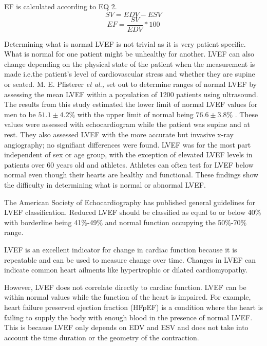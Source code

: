 \documentclass[12pt]{article}
\begin{document}
EF is calculated according to EQ 2.
\begin{equation}
SV = EDV - ESV
\end{equation}
\begin{equation}
EF = \frac{SV}{EDV} * 100   
\end{equation}

Determining what is normal LVEF is not trivial as it is very patient specific.
What is normal for one patient might be unhealthy for another.
LVEF can also change depending on the physical state of the patient when the measurement is made i.e.the patient's level of cardiovascular stress and whether they are supine or seated.
M. E. Pfisterer \textit{et al.,}  set out to determine ranges of normal LVEF by assessing the mean LVEF within a population of 1200 patients using ultrasound.
The results from this study estimated the lower limit of normal LVEF values for men to be $ 51.1 \pm 4.2\%$ with the upper limit of normal being $ 76.6 \pm 3.8\%$ \cite{ef_soa}.
These values were assessed with echocardiogram while the patient was supine and at rest.
They also assessed LVEF with the more accurate but invasive x-ray angiography; no signifiant differences were found.
LVEF was for the most part independent of sex or age group, with the exception of elevated LVEF levels in patients over 60 years old and athletes. Athletes can often test for LVEF below normal even though their hearts are healthy and functional.
These findings show the difficulty in determining what is normal or abnormal LVEF.

The American Society of Echocardiography has published general guidelines for LVEF classification.
Reduced LVEF should be classified as equal to or below 40\% with
borderline being 41\%-49\%
and normal function occupying the 50\%-70\% range.\cite{ase_webpage_LVEF_norm}

LVEF is an excellent indicator for change in cardiac function because it is repeatable  and can be used to measure change over time. 
Changes in LVEF can indicate common heart ailments like hypertrophic or dilated cardiomyopathy.



However, LVEF does not correlate directly to cardiac function. LVEF can be within normal values while the function of the heart is impaired.
For example, heart failure preserved ejection fraction (HFpEF) is a condition where the heart is failing to supply the body with enough blood in the presence of normal LVEF.
This is because LVEF only depends on EDV and ESV and does not take into account the time duration or the geometry of the contraction.
%
\end{document}
